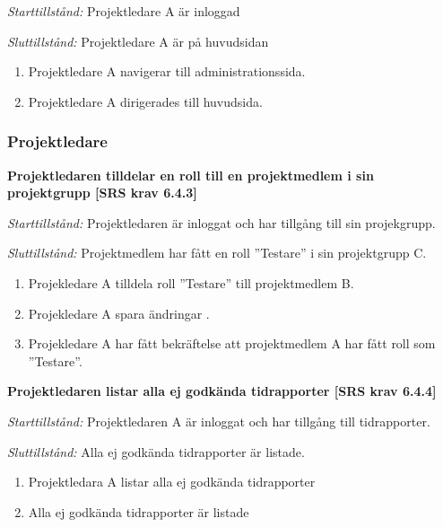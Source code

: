 \documentclass[a4paper]{article}
\begin{document}
\begin{FT}
\emph{Starttillstånd:} Projektledare A är inloggad

\emph{Sluttillstånd:} Projektledare A är på huvudsidan 

\begin{enumerate}
\item Projektledare A navigerar till administrationssida.
\item Projektledare A dirigerades till huvudsida.

\end{enumerate}
\end{FT}

\subsubsection{Projektledare}
\begin{FT}

\item %
\textbf{Projektledaren tilldelar en roll till en projektmedlem i sin projektgrupp [SRS krav 6.4.3]}

\emph{Starttillstånd:} Projektledaren är inloggat och har tillgång till sin projekgrupp.

\emph{Sluttillstånd:} Projektmedlem har fått en roll ”Testare” i sin projektgrupp C.

\begin{enumerate}
\item Projekledare A tilldela roll ”Testare” till projektmedlem B.
\item Projekledare A spara ändringar .
\item Projekledare A har fått bekräftelse att projektmedlem A har fått roll som ”Testare”.
\end{enumerate}

\item %
\textbf{Projektledaren listar alla ej godkända tidrapporter [SRS krav 6.4.4]}

\emph{Starttillstånd:} Projektledaren A är inloggat och har tillgång till tidrapporter.

\emph{Sluttillstånd:} Alla ej godkända tidrapporter är listade.                          

\begin{enumerate}
\item Projektledara A listar alla ej godkända tidrapporter
\item Alla ej godkända tidrapporter är listade
\end{enumerate}


\end{FT}
\end{document}
